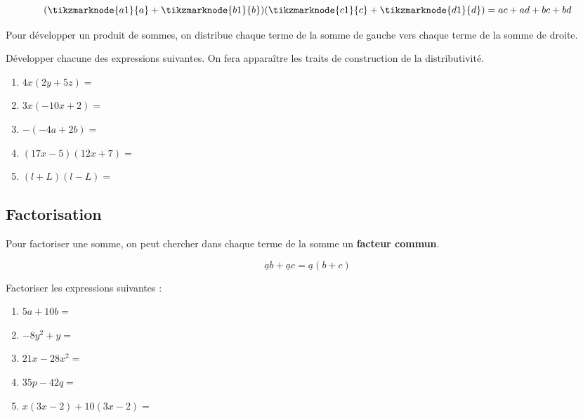 \documentclass{article}
\begin{document}
\begin{equation*}
(\tikzmarknode{a1}{a} + \tikzmarknode{b1}{b})(\tikzmarknode{c1}{c} + \tikzmarknode{d1}{d}) =
ac + ad + bc + bd
\end{equation*}
\begin{tcolorbox}
Pour développer un produit de sommes, on \og distribue \fg chaque terme de la somme de gauche vers chaque terme de la somme de droite.
\end{tcolorbox}
\begin{example}
Développer chacune des expressions suivantes. On fera apparaître les traits de construction de la distributivité.
\begin{enumerate}[label=\alph*), parsep=0.5cm, topsep=0.5cm]
\item $4x(2y + 5z) = $ \answersline
\item $3x(-10x + 2) = $ \answersline
\item $-(-4a + 2b) = $ \answersline
\item $(17x - 5)(12x + 7) = $ \answersline
\item $(l + L)(l - L) = $ \answersline
\end{enumerate}
\end{example}

\newpage
\subsection{Factorisation}
\begin{tcolorbox}
Pour factoriser une somme, on peut chercher dans chaque terme de la somme un \textbf{facteur commun}.
\end{tcolorbox}
\begin{equation*}
\underline{a}b + \underline{a}c = \underline{a}(b + c)
\end{equation*}
\begin{example}
Factoriser les expressions suivantes :
\begin{enumerate}[label=\emph{\alph*)}]
\item $5a + 10b =$ \answersline
\item $-8y^2 + y =$ \answersline
\item $21x - 28x^2 =$ \answersline
\item $35p - 42q =$ \answersline
\item $x(3x - 2) + 10(3x - 2) =$ \answersline
\end{enumerate}
\end{example}
\end{document}
